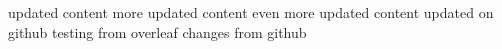 updated content
more updated content
even more updated content
updated on github
testing from overleaf
changes from github
